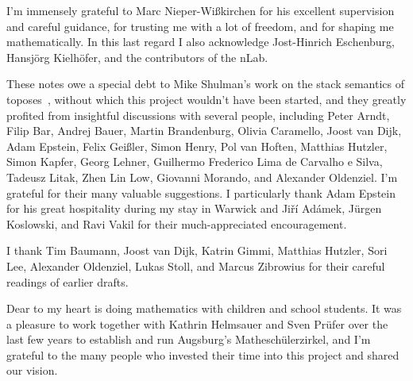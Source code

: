 \documentclass[10pt,reqno,a4paper]{amsbook}
\theoremstyle{definition}
\theoremstyle{plain}
\theoremstyle{remark}
\newcommand{\?}{\,{:}\,}
\renewcommand{\_}{\mathpunct{.}\,}
\begin{document}
{I'm immensely grateful to Marc Nieper-Wißkirchen for his excellent supervision and
careful guidance, for trusting me with a lot of freedom, and for shaping me
mathematically. In this last regard I also acknowledge Jost-Hinrich Eschenburg,
Hansjörg Kielhöfer, and the contributors of the nLab.

These notes owe a special debt to Mike Shulman's work on the stack semantics of
toposes~\cite{shulman:stack}, without which this project wouldn't have been
started, and they greatly profited from insightful discussions with several people,
including Peter Arndt, Filip Bar, Andrej Bauer, Martin Brandenburg, Olivia
Caramello, Joost van Dijk, Adam Epstein, Felix Geißler, Simon Henry, Pol van Hoften, Matthias Hutzler, Simon
Kapfer, Georg Lehner, Guilhermo Frederico Lima de Carvalho e Silva, Tadeusz Litak, Zhen Lin
Low, Giovanni Morando, and Alexander Oldenziel. I'm grateful for their many valuable suggestions. I
particularly thank Adam Epstein for his great hospitality during my stay in
Warwick and Jiří Adámek, Jürgen Koslowski, and Ravi Vakil for their
much-appreciated encouragement.

I thank Tim Baumann, Joost van Dijk, Katrin Gimmi, Matthias Hutzler, Sori Lee, Alexander Oldenziel, Lukas Stoll, and Marcus Zibrowius for their
careful readings of earlier drafts.

Dear to my heart is doing mathematics with children and school students. It was
a pleasure to work together with Kathrin Helmsauer and Sven Prüfer over the
last few years to establish and run Augsburg's Matheschülerzirkel, and I'm
grateful to the many people who invested their time into this project and shared our
vision.

}
\end{document}
